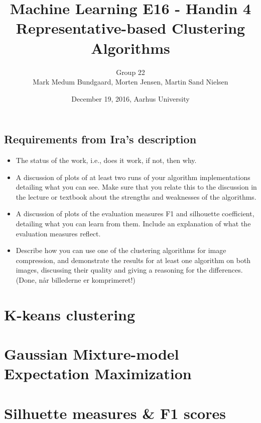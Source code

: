 \documentclass[a4paper,10pt,article,oneside,english]{memoir}
\begin{document}
	\title{Machine Learning E16 - Handin 4\\
		Representative-based Clustering Algorithms}
	\author{Group 22\\
		Mark Medum Bundgaard, Morten Jensen, Martin Sand Nielsen}
	\date{December 19, 2016, Aarhus University}
	
	\mainmatter
	\maketitle


\subsection{Requirements from Ira's description}
\begin{itemize}
	\item The status of the work, i.e., does it work, if not, then why.
	\item A discussion of plots of at least two runs of your algorithm implementations detailing what you can see. Make sure that you relate this to the discussion in the lecture or textbook about the strengths and weaknesses of the algorithms.
	\item A discussion of plots of the evaluation measures F1 and silhouette coefficient, detailing what you can learn from them. Include an explanation of what the evaluation measures reflect.
	\item Describe how you can use one of the clustering algorithms for image compression, and demonstrate the results for at least one algorithm on both images, discussing their quality and giving a reasoning for the differences. (Done, når billederne er komprimeret!)
\end{itemize}

\section*{K-keans clustering}

\section*{Gaussian Mixture-model Expectation Maximization}


\section*{Silhuette measures \& F1 scores}
\end{document}
